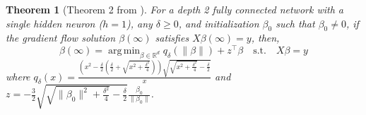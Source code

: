 \documentclass{article}
\theoremstyle{plain}
\newtheorem{theorem}{Theorem}[section]
\theoremstyle{definition}
\theoremstyle{remark}
\DeclareMathOperator*{\argmin}{arg\,min}
\begin{document}
\begin{theorem}[Theorem 2 from \citet{azulay2021implicit}]
    \label{thrm:single-neuron-azulay}
    For a depth 2 fully connected network with a single hidden neuron ($h = 1$), any $\delta \ge 0$, and initialization $\beta_0$ such that $\beta_0 \neq 0$, if the gradient flow solution $\beta(\infty)$ satisfies $X \beta(\infty) = y$, then,
    \begin{equation}
        \beta(\infty) = \argmin_{\beta \in \mathbb{R}^d} q_\delta(\|\beta\|) + z^\intercal \beta \quad \mathrm{s.t.} \quad X \beta = y
    \end{equation}
    where $q_\delta(x) = \frac{\left(x^2 - \frac{\delta}{2}\left(\frac{\delta}{2} + \sqrt{x^2 + \frac{\delta^2}{4}}\right)\right)\sqrt{\sqrt{x^2 + \frac{\delta^2}{4}} - \frac{\delta}{2}}}{x}$ and $z = -\frac{3}{2}\sqrt{\sqrt{\|\beta_0\|^2 + \frac{\delta^2}{4}} - \frac{\delta}{2}} \frac{\beta_0}{\|\beta_0\|}$.
\end{theorem}
\end{document}
